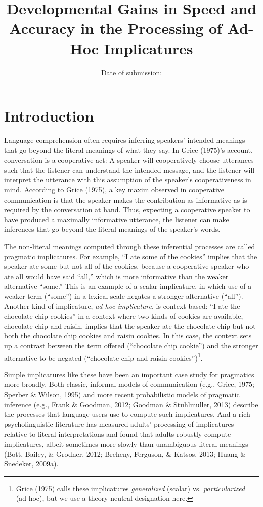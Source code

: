 \documentclass[a4paper,man,apacite,floatsintext]{apa6}
\date{}
\title{\textbf{Developmental Gains in Speed and Accuracy in the Processing of Ad-Hoc
Implicatures}}
\author{Date of submission:}
\affiliation{September 9, 2016}
\begin{document}
\maketitle

\section{Introduction}\label{introduction}

Language comprehension often requires inferring speakers' intended
meanings that go beyond the literal meanings of what they say. In Grice
(1975)'s account, conversation is a cooperative act: A speaker will
cooperatively choose utterances such that the listener can understand
the intended message, and the listener will interpret the utterance with
this assumption of the speaker's cooperativeness in mind. According to
Grice (1975), a key maxim observed in cooperative communication is that
the speaker makes the contribution as informative as is required by the
conversation at hand. Thus, expecting a cooperative speaker to have
produced a maximally informative utterance, the listener can make
inferences that go beyond the literal meanings of the speaker's words.

The non-literal meanings computed through these inferential processes
are called pragmatic implicatures. For example, ``I ate some of the
cookies'' implies that the speaker ate some but not all of the cookies,
because a cooperative speaker who ate all would have said ``all,'' which
is more informative than the weaker alternative ``some.'' This is an
example of a scalar implicature, in which use of a weaker term
(``some'') in a lexical scale negates a stronger alternative (``all'').
Another kind of implicature, \emph{ad-hoc implicature}, is
context-based: ``I ate the chocolate chip cookies'' in a context where
two kinds of cookies are available, chocolate chip and raisin, implies
that the speaker ate the chocolate-chip but not both the chocolate chip
cookies and raisin cookies. In this case, the context sets up a contrast
between the term offered (``chocolate chip cookie'') and the stronger
alternative to be negated (``chocolate chip and raisin
cookies'')\footnote{Grice (1975) calls these implicatures
  \emph{generalized} (scalar) vs. \emph{particularized} (ad-hoc), but we
  use a theory-neutral designation here.}.

Simple implicatures like these have been an important case study for
pragmatics more broadly. Both classic, informal models of communication
(e.g., Grice, 1975; Sperber \& Wilson, 1995) and more recent
probabilistic models of pragmatic inference (e.g., Frank \& Goodman,
2012; Goodman \& Stuhlmuller, 2013) describe the processes that language
users use to compute such implicatures. And a rich psycholinguistic
literature has measured adults' processing of implicatures relative to
literal interpretations and found that adults robustly compute
implicatures, albeit sometimes more slowly than unambiguous literal
meanings (Bott, Bailey, \& Grodner, 2012; Breheny, Ferguson, \& Katsos,
2013; Huang \& Snedeker, 2009a).
\end{document}
